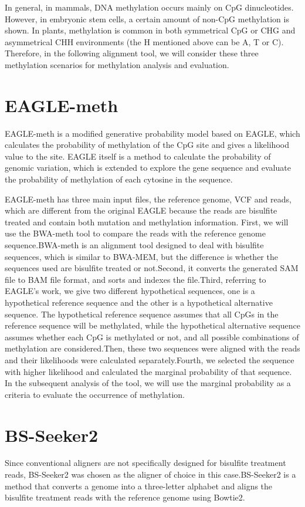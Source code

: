 \documentclass{PHlab-thesis}
\begin{document}
\par
In general, in mammals, DNA methylation occurs mainly on CpG dinucleotides. However, in embryonic stem cells, a certain amount of non-CpG methylation is shown. In plants, methylation is common in both symmetrical CpG or CHG and asymmetrical CHH environments (the H mentioned above can be A, T or C). Therefore, in the following alignment tool, we will consider these three methylation scenarios for methylation analysis and evaluation.

\section{EAGLE-meth}
EAGLE-meth is a modified generative probability model based on EAGLE\cite{kuo2018eagle}, which calculates the probability of methylation of the CpG site and gives a likelihood value to the site. EAGLE itself is a method to calculate the probability of genomic variation, which is extended to explore the gene sequence and evaluate the probability of methylation of each cytosine in the sequence.

\par
EAGLE-meth has three main input files, the reference genome, VCF and reads, which are different from the original EAGLE because the reads are bisulfite treated and contain both mutation and methylation information. First, we will use the BWA-meth tool to compare the reads with the reference genome sequence.BWA-meth is an alignment tool designed to deal with bisulfite sequences, which is similar to BWA-MEM, but the difference is whether the sequences used are bisulfite treated or not.Second, it converts the generated SAM file to BAM file format, and sorts and indexes the file.Third, referring to EAGLE's work, we give two different hypothetical sequences, one is a hypothetical reference sequence and the other is a hypothetical alternative sequence. The hypothetical reference sequence assumes that all CpGs in the reference sequence will be methylated, while the hypothetical alternative sequence assumes whether each CpG is methylated or not, and all possible combinations of methylation are considered.Then, these two sequences were aligned with the reads and their likelihoods were calculated separately.Fourth, we selected the sequence with higher likelihood and calculated the marginal probability of that sequence. In the subsequent analysis of the tool, we will use the marginal probability as a criteria to evaluate the occurrence of methylation.

\section{BS-Seeker2}
Since conventional aligners are not specifically designed for bisulfite treatment reads, BS-Seeker2 was chosen as the aligner of choice in this case.BS-Seeker2 is a method that converts a genome into a three-letter alphabet and aligns the bisulfite treatment reads with the reference genome using Bowtie2.
\end{document}
